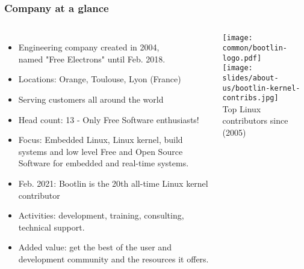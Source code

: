 \begin{frame}
\frametitle{Company at a glance}
  \begin{columns}
  \small
  \begin{itemize}
    \item Engineering company created in 2004,\\
	  named "Free Electrons" until Feb. 2018.
    \item Locations: Orange, Toulouse, Lyon (France)
    \item Serving customers all around the world
    \item Head count: 13 - Only Free Software enthusiasts!
    \item Focus: Embedded Linux, Linux kernel,
          build systems and low level Free and Open Source Software
          for embedded and real-time systems.
    \item Feb. 2021: Bootlin is the 20th all-time Linux kernel contributor
    \item Activities: development, training, consulting, technical
          support.
    \item Added value: get the best of the user and development
          community and the resources it offers.
  \end{itemize}
  \texttt{[image: common/bootlin-logo.pdf]}\\
  \vspace{0.25cm}
  \texttt{[image: slides/about-us/bootlin-kernel-contribs.jpg]}\\
  \tiny Top Linux contributors since  (2005)
  \end{columns}
\end{frame}

